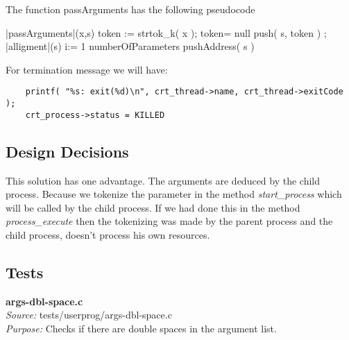 	  The function passArguments has the following pseudocode


    \begin{program}
    \BEGIN %
    \PROC |passArguments|(x,s) \BODY
              \DO
		token := strtok\_k( x );
		\IF token= null 
		  \THEN \EXIT 
		  \ELSE push( s, token )   
		\FI;
	      \OD
	      |alligment|(s)
              \FOR i:= 1 \TO numberOfParameters  \DO
		pushAddress( s ) \OD
     \ENDPROC
    \END
    \end{program}

    For termination message we will have:

    \begin{lstlisting}
	printf( "%s: exit(%d)\n", crt_thread->name, crt_thread->exitCode );
	crt_process->status = KILLED
    \end{lstlisting}


    \subsection{Design Decisions}

	This solution has one advantage. The arguments are deduced by the child process. Because we tokenize the parameter in the method \textit{start\_process} which will be called by the child process. If we had done this in the method \textit{process\_execute} then the tokenizing was made by the parent process and the child process, doesn't process his own resources.

    \subsection{Tests}

      \textbf{args-dbl-space.c}\\
      \textit{Source:} tests/userprog/args-dbl-space.c\\
      \textit{Purpose:} Checks if there are double spaces 
	  in the argument list.


